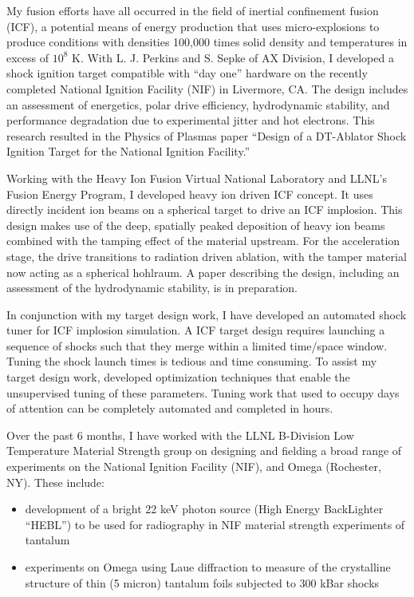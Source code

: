 \documentclass[letterpaper,11pt]{article}
\begin{document}
My fusion efforts have all occurred in the field of inertial confinement fusion
(ICF), a potential means of energy production that uses micro-explosions to
produce conditions with densities 100,000 times solid density and temperatures
in excess of $10^8$ K.  With L. J. Perkins and S. Sepke of AX Division, I developed a shock
ignition target compatible with ``day one'' hardware on the recently completed
National Ignition Facility (NIF) in Livermore, CA\@.  The design includes an
assessment of energetics, polar drive efficiency, hydrodynamic stability, and
performance degradation due to experimental jitter and hot electrons.  This
research resulted in the Physics of Plasmas paper ``Design of a DT-Ablator
Shock Ignition Target for
the National Ignition Facility.''

Working with the Heavy Ion Fusion Virtual National Laboratory and LLNL's Fusion
Energy Program, I developed heavy ion driven ICF concept. It uses directly
incident ion beams on a spherical target to drive an ICF implosion.  This
design makes use of the deep, spatially peaked deposition of heavy ion beams
combined with the tamping effect of the material upstream.  For the
acceleration
stage, the drive transitions to radiation driven ablation, with the tamper
material now acting as a spherical hohlraum.  A paper describing the design,
including an assessment of the hydrodynamic stability, is in preparation.  

In conjunction with my target design work, I have developed an automated shock
tuner for ICF implosion simulation.  A ICF target design requires launching a
sequence of shocks such that they merge within a limited time/space window.
Tuning the shock launch times is tedious and time consuming.  To assist my
target design work, developed optimization techniques that enable the
unsupervised tuning of these parameters.  Tuning work that used to occupy days
of attention can be completely automated and completed in hours.

Over the past 6 months, I have worked with the LLNL B-Division Low Temperature
Material Strength group on designing and fielding a broad range of experiments on the National
Ignition Facility (NIF), and Omega (Rochester, NY).
These include:
\begin{itemize}
	\item development of a bright 22 keV photon source (High Energy BackLighter
		``HEBL'') to be used for radiography in NIF material strength experiments
		of tantalum
	\item experiments on Omega using Laue diffraction to measure of the
		crystalline structure of thin (5 micron) tantalum foils subjected
		to 300 kBar shocks
\end{itemize}
\end{document}
